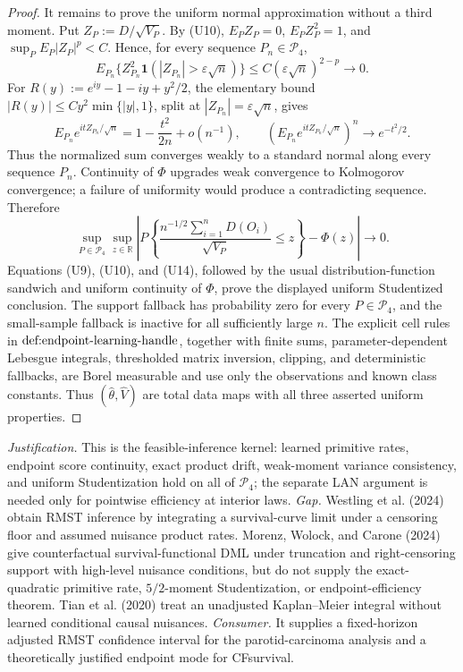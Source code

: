 \documentclass{article}
\begin{document}
\begin{proof}
It remains to prove the uniform normal approximation without a third moment.  Put \(Z_P:=D/\sqrt{V_P}\).  By (U10), \(E_PZ_P=0\), \(E_PZ_P^2=1\), and \(\sup_PE_P|Z_P|^p<C\).  Hence, for every sequence \(P_n\in\mathcal P_4\),
\[
 E_{P_n}\{Z_{P_n}^2\mathbf 1(|Z_{P_n}|>\varepsilon\sqrt n)\}
 \le C(\varepsilon\sqrt n)^{2-p}\longrightarrow0.                    \tag{U15}
\]
For \(R(y):=e^{iy}-1-iy+y^2/2\), the elementary bound \(|R(y)|\le Cy^2\min\{|y|,1\}\), split at \(|Z_{P_n}|=\varepsilon\sqrt n\), gives
\[
 E_{P_n}e^{itZ_{P_n}/\sqrt n}=1-\frac{t^2}{2n}+o(n^{-1}),
 \qquad \left(E_{P_n}e^{itZ_{P_n}/\sqrt n}\right)^n\longrightarrow e^{-t^2/2}. \tag{U16}
\]
Thus the normalized sum converges weakly to a standard normal along every sequence \(P_n\).  Continuity of \(\Phi\) upgrades weak convergence to Kolmogorov convergence; a failure of uniformity would produce a contradicting sequence.  Therefore
\[
 \sup_{P\in\mathcal P_4}\sup_{z\in\mathbb R}
 \left|P\!\left\{
 \frac{n^{-1/2}\sum_{i=1}^nD(O_i)}{\sqrt{V_P}}\le z
 \right\}-\Phi(z)\right|\longrightarrow0.                            \tag{U17}
\]
Equations (U9), (U10), and (U14), followed by the usual distribution-function sandwich and uniform continuity of \(\Phi\), prove the displayed uniform Studentized conclusion.  The support fallback has probability zero for every \(P\in\mathcal P_4\), and the small-sample fallback is inactive for all sufficiently large \(n\).  The explicit cell rules in \(\textnormal{def:endpoint-learning-handle}\), together with finite sums, parameter-dependent Lebesgue integrals, thresholded matrix inversion, clipping, and deterministic fallbacks, are Borel measurable and use only the observations and known class constants.  Thus \((\widehat\theta,\widehat V)\) are total data maps with all three asserted uniform properties.
\end{proof}
\par\smallskip\noindent \textit{Justification.} This is the feasible-inference kernel: learned primitive rates, endpoint score continuity, exact product drift, weak-moment variance consistency, and uniform Studentization hold on all of \(\mathcal P_4\); the separate LAN argument is needed only for pointwise efficiency at interior laws. \textit{Gap.} Westling et al. (2024) obtain RMST inference by integrating a survival-curve limit under a censoring floor and assumed nuisance product rates. Morenz, Wolock, and Carone (2024) give counterfactual survival-functional DML under truncation and right-censoring support with high-level nuisance conditions, but do not supply the exact-quadratic primitive rate, \(5/2\)-moment Studentization, or endpoint-efficiency theorem. Tian et al. (2020) treat an unadjusted Kaplan--Meier integral without learned conditional causal nuisances. \textit{Consumer.} It supplies a fixed-horizon adjusted RMST confidence interval for the parotid-carcinoma analysis and a theoretically justified endpoint mode for CFsurvival.
\end{document}
